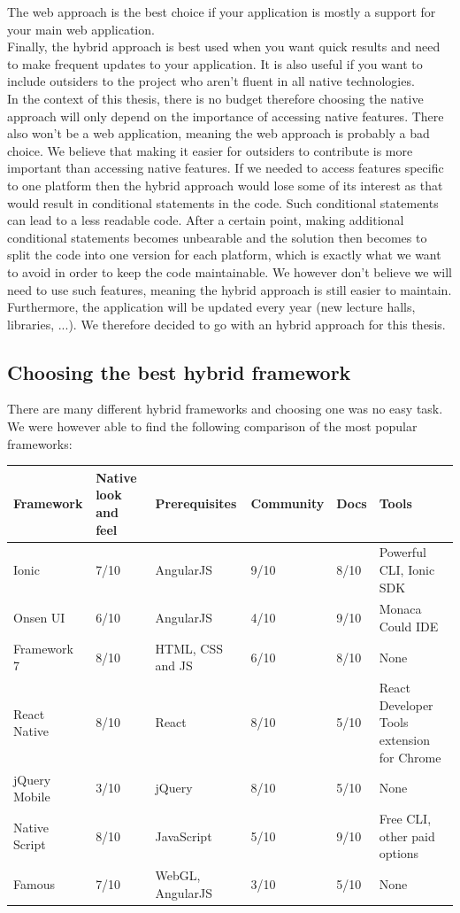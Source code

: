 \documentclass{eplmastersthesis}
\begin{document}
The web approach is the best choice if your application is mostly a support for your main web application.\\

Finally, the hybrid approach is best used when you want quick results and need to make frequent updates to your application. It is also useful if you want to include outsiders to the project who aren't fluent in all native technologies.\\

In the context of this thesis, there is no budget therefore choosing the native approach will only depend on the importance of accessing native features. There also won't be a web application, meaning the web approach is probably a bad choice. We believe that making it easier for outsiders to contribute is more important than accessing native features. If we needed to access features specific to one platform then the hybrid approach would lose some of its interest as that would result in conditional statements in the code. Such conditional statements can lead to a less readable code. After a certain point, making additional conditional statements becomes unbearable and the solution then becomes to split the code into one version for each platform, which is exactly what we want to avoid in order to keep the code maintainable. We however don't believe we will need to use such features, meaning the hybrid approach is still easier to maintain. Furthermore, the application will be updated every year (new lecture halls, libraries, ...). We therefore decided to go with an hybrid approach for this thesis.

\newpage
\subsection{Choosing the best hybrid framework}
There are many different hybrid frameworks and choosing one was no easy task. We were however able to find the following comparison of the most popular frameworks:

\begin{center}
    \begin{tabular}{ | l | p{2cm} | l | l | l | p{3cm} |}
    \hline
    Framework & Native look and feel & Prerequisites  & Community & Docs & Tools\\ \hline
    Ionic & 7/10 & AngularJS & 9/10 & 8/10 & Powerful CLI, Ionic SDK\\ \hline
    Onsen UI & 6/10 & AngularJS & 4/10 & 9/10 & Monaca Could IDE \\ \hline
    Framework 7 & 8/10 & HTML, CSS and JS & 6/10 & 8/10 & None \\ \hline
    React Native & 8/10 & React & 8/10 & 5/10 & React Developer Tools extension for Chrome \\ \hline
    jQuery Mobile & 3/10 & jQuery & 8/10 & 5/10 & None \\ \hline
   Native Script & 8/10 & JavaScript & 5/10 & 9/10 & Free CLI, other paid options \\ \hline
   Famous & 7/10 & WebGL, AngularJS & 3/10 & 5/10 & None \\ \hline
    \end{tabular}
\end{center}
\end{document}
